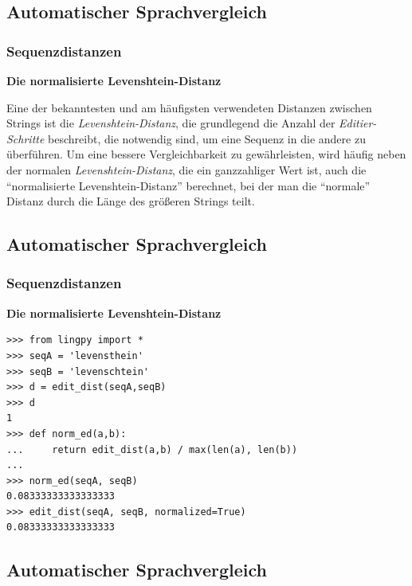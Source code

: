 \subsection{\texorpdfstring{{Automatischer
Sprachvergleich}}{Automatischer Sprachvergleich}}

\subsubsection{\texorpdfstring{{Sequenzdistanzen}}{Sequenzdistanzen}}

\textbf{Die normalisierte Levenshtein-Distanz}

Eine der bekanntesten und am häufigsten verwendeten Distanzen zwischen
Strings ist die \emph{Levenshtein-Distanz}, die grundlegend die Anzahl
der \emph{Editier-Schritte} beschreibt, die notwendig sind, um eine
Sequenz in die andere zu überführen. Um eine bessere Vergleichbarkeit zu
gewährleisten, wird häufig neben der normalen
\emph{Levenshtein-Distanz}, die ein ganzzahliger Wert ist, auch die
``normalisierte Levenshtein-Distanz'' berechnet, bei der man die
``normale'' Distanz durch die Länge des größeren Strings teilt.

\subsection{\texorpdfstring{{Automatischer
Sprachvergleich}}{Automatischer Sprachvergleich}}

\subsubsection{\texorpdfstring{{Sequenzdistanzen}}{Sequenzdistanzen}}

\textbf{Die normalisierte Levenshtein-Distanz}

\begin{verbatim}
>>> from lingpy import *
>>> seqA = 'levensthein'
>>> seqB = 'levenschtein'
>>> d = edit_dist(seqA,seqB)
>>> d
1
>>> def norm_ed(a,b):
...     return edit_dist(a,b) / max(len(a), len(b))
...
>>> norm_ed(seqA, seqB)
0.08333333333333333
>>> edit_dist(seqA, seqB, normalized=True)
0.08333333333333333
\end{verbatim}

\subsection{\texorpdfstring{{Automatischer
Sprachvergleich}}{Automatischer Sprachvergleich}}

